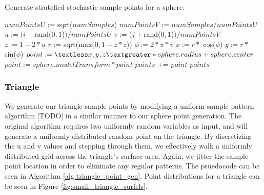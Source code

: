 \begin{algorithm}[H]
\captionfont
\caption[Sphere point generation]{Generate stratefied stochastic sample points for a sphere.}
\label{alg:sphere_point_gen}
{\fontsize{10}{9}\selectfont
\begin{algorithmic}
      \State $numPointsU$ := sqrt($numSamples$)
      \State $numPointsV$ := $numSamples / numPointsU$
            \State $u := (i + $rand($0,1$)$) / numPointsU$
            \State $v := (j + $rand($0,1$)$) / numPointsV$
            \State $z := 1 - 2*u$
            \State $r$ := sqrt(max($0, 1- z*z$))
            \State $\phi := 2 * \pi * v$
            \State $x := r *$ cos($\phi$)
            \State $y := r *$ sin($\phi$)
            \State $point := \textless x, y, z \textgreater * sphere.radius + sphere.center$
            \State $point := sphere.modelTransform * point$
            \State $points$ += $point$
         \EndFor
      \EndFor
      \State \Return $points$
   \EndFunction
\end{algorithmic}
}
\end{algorithm}

\subsubsection{Triangle}
\label{sec:triangle_point_gen}
We generate our triangle sample points by modifying a uniform sample pattern algorithm [TODO] in a similar manner to our sphere point generation.
The original algorithm requires two uniformly random variables as input, and will generate a uniformly distributed random point on the triangle.
By discretizing the u and v values and stepping through them, we effectively walk a uniformly distributed grid across the triangle's surface area.
Again, we jitter the sample point location in order to eliminate any regular patterns.
The psuedocode can be seen in Algorithm \ref{alg:triangle_point_gen}.
Point distributions for a triangle can be seen in Figure \ref{fig:small_triangle_surfels}.

